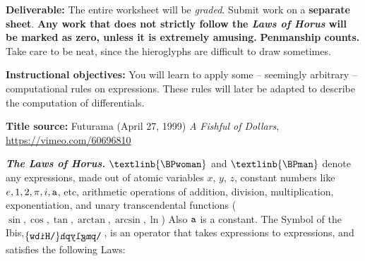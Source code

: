 \documentclass[10pt]{report}
\begin{document}
 
\thispagestyle{empty}
\vspace{12pt}

{\bf Deliverable:}  The entire worksheet will be {\em graded}.  Submit work on a {\bf separate sheet}.  {\bf Any work that does not strictly follow the {\em Laws of Horus} will be marked as zero, unless it is extremely amusing.}  {\bf Penmanship counts.}  Take care to be neat, since the hieroglyphs are difficult to draw sometimes.  

{\bf Instructional objectives:}  You will learn to apply some -- seemingly arbitrary -- computational rules on expressions.  These rules will later be adapted to describe the computation of differentials.

{\bf Title source:} Futurama (April 27, 1999) {\em A Fishful of Dollars}, \href{https://vimeo.com/60696810}{https://vimeo.com/60696810}

\def\x{\textlinb{\BPwoman}}
\def\y{\textlinb{\BPman}}
\def\a{{\tt a}}
\def\d{\text{\reflectbox{\raisebox{-3pt}{\pmglyph{\Hibw}}\!\!}}}

{\em {\bf The Laws of Horus.}} $\x$ and $\y$ denote any expressions, made out of atomic variables $x$, $y$, $z$, constant numbers like $e,1,2,\pi,i,\a$, etc, arithmetic operations of addition, division, multiplication, exponentiation, and unary transcendental functions ($\sin,\cos,\tan,\arctan,\arcsin,\ln$)  Also $\a$ is a constant.  The Symbol of the Ibis, $\d\,$, is an operator that takes expressions to expressions, and satisfies the following Laws:
\end{document}
